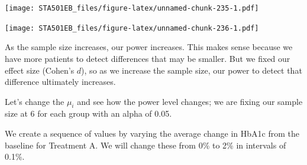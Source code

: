 \documentclass[
]{book}
\newenvironment{Shaded}{\begin{snugshade}}{\end{snugshade}}
\newcommand{\AttributeTok}[1]{\textcolor[rgb]{0.13,0.29,0.53}{#1}}
\newcommand{\DecValTok}[1]{\textcolor[rgb]{0.00,0.00,0.81}{#1}}
\newcommand{\FloatTok}[1]{\textcolor[rgb]{0.00,0.00,0.81}{#1}}
\newcommand{\FunctionTok}[1]{\textcolor[rgb]{0.13,0.29,0.53}{\textbf{#1}}}
\newcommand{\NormalTok}[1]{#1}
\newcommand{\OtherTok}[1]{\textcolor[rgb]{0.56,0.35,0.01}{#1}}
\newcommand{\SpecialCharTok}[1]{\textcolor[rgb]{0.81,0.36,0.00}{\textbf{#1}}}
\newcommand{\StringTok}[1]{\textcolor[rgb]{0.31,0.60,0.02}{#1}}
\begin{document}
\begin{Shaded}
\end{Shaded}

\texttt{[image: STA501EB\_files/figure-latex/unnamed-chunk-235-1.pdf]}

\texttt{[image: STA501EB\_files/figure-latex/unnamed-chunk-236-1.pdf]}

As the sample size increases, our power increases. This makes sense because we have more patients to detect differences that may be smaller. But we fixed our effect size (Cohen's \(d\)), so as we increase the sample size, our power to detect that difference ultimately increases.

Let's change the \(\mu_{i}\) and see how the power level changes; we are fixing our sample size at 6 for each group with an alpha of 0.05.

We create a sequence of values by varying the average change in HbA1c from the baseline for Treatment A. We will change these from 0\% to 2\% in intervals of 0.1\%.

\begin{Shaded}
\end{Shaded}
\end{document}
